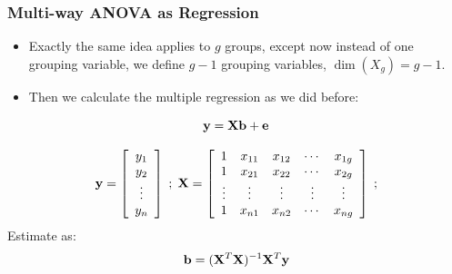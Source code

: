 \documentclass{beamer}
\begin{document}
\begin{frame}
  \frametitle{Multi-way ANOVA as Regression}

\begin{itemize}

\item Exactly the same idea applies to $g$ groups, except now instead of one grouping variable, we define $g-1$ grouping variables, $\dim(X_g) = g-1$.

\item Then we calculate the multiple regression as we did before:

\end{itemize}

$$
\mathbf{y} = \mathbf{X}\mathbf{b} + \mathbf{e}
$$

$$
\mathbf{y} = \left[ \begin{array}{c}
y_1 \\ y_2 \\ \vdots \\y_n \\
\end{array}
\right]
\;
;
\;
\mathbf{X} = \left[ \begin{array}{ccccc}
1 & x_{11} & x_{12} & \cdots & x_{1g} \\
1 & x_{21} & x_{22} & \cdots & x_{2g} \\
\vdots & \vdots & \vdots & \vdots & \vdots \\
1 & x_{n1} & x_{n2} & \cdots & x_{ng} \\
\end{array}
\right]
\;
;
$$
%
Estimate  as:
$$
\mathbf{b} = (\mathbf{X}^T \mathbf{X})^{-1}\mathbf{X}^T\mathbf{y}
$$

\end{frame}
\end{document}
